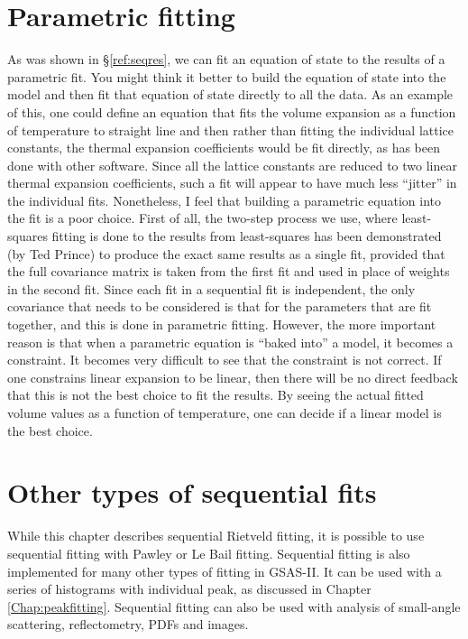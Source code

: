 \section{Parametric fitting}
As was shown in \S\ref{ref:seqres}, we can fit an equation of state to the results of a parametric fit. You might think it better to build the equation of state into the model and then fit that equation of state directly to all the data.
As an example of this, one could define an equation that fits the volume expansion as a function of temperature to straight line and then rather than fitting the individual lattice constants, the thermal expansion coefficients would be fit directly, as has been done with other software. Since all the lattice constants are reduced to two linear thermal expansion coefficients, such a fit will appear to have much less ``jitter'' in the individual fits. Nonetheless, I feel that building a parametric equation into the fit is a poor choice. First of all, the two-step process we use, where least-squares fitting is done to the results from least-squares has been demonstrated (by Ted Prince) to produce the exact same results as a single fit, provided that the full covariance matrix is taken from the first fit and used in place of weights in the second fit. Since each fit in a sequential fit is independent, the only covariance that needs to be considered is that for the parameters that are fit together, and this is done in parametric fitting. However, the more important reason is that when a parametric equation is ``baked into'' a model, it becomes a constraint. It becomes very difficult to see that the constraint is not correct. If one constrains linear expansion to be linear, then there will be no direct feedback that this is not the best choice to fit the results. By seeing the actual fitted volume values as a function of temperature, one can decide if a linear model is the best choice. 

\section{Other types of sequential fits}
While this chapter describes sequential Rietveld fitting, it is possible to use sequential fitting with Pawley or Le Bail fitting. Sequential fitting is also implemented for many other types of fitting in GSAS-II. It can be used with a series of histograms with individual peak, as discussed in Chapter \ref{Chap:peakfitting}. Sequential fitting can also be used with analysis of small-angle scattering, reflectometry, PDFs and images. 


